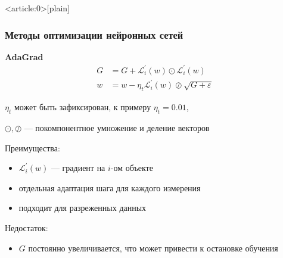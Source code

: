 \documentclass[fullscreen=true, bookmarks=true, hyperref={pdfencoding=unicode}]{beamer}
\begin{document}
{ %
    \begin{frame}<article:0>[plain]
     \end{frame}
}

\begin{frame}
  \frametitle{Методы оптимизации нейронных сетей}
  {\bf AdaGrad}
  \begin{align*}
     G &= G + \mathcal{L}_i^\prime(w) \odot \mathcal{L}_i^\prime(w) \\
     w &= w - {\eta_t} {\mathcal{L}_i^\prime(w)}\oslash{\sqrt{G + \varepsilon}}
  \end{align*}

  $\eta_t$ может быть зафиксирован, к примеру $\eta_t = 0.01$,

  $\odot, \oslash$ — покомпонентное умножение и деление векторов

  Преимущества:
  \begin{itemize}
    \item $\mathcal{L}_i^\prime(w)$ — градиент на $i$-ом объекте
    \item отдельная адаптация шага для каждого измерения
    \item подходит для разреженных данных
  \end{itemize}

 Недостаток:
 \begin{itemize}
   \item $G$ постоянно увеличивается, что может привести к остановке обучения
 \end{itemize}
\end{frame}
\end{document}
